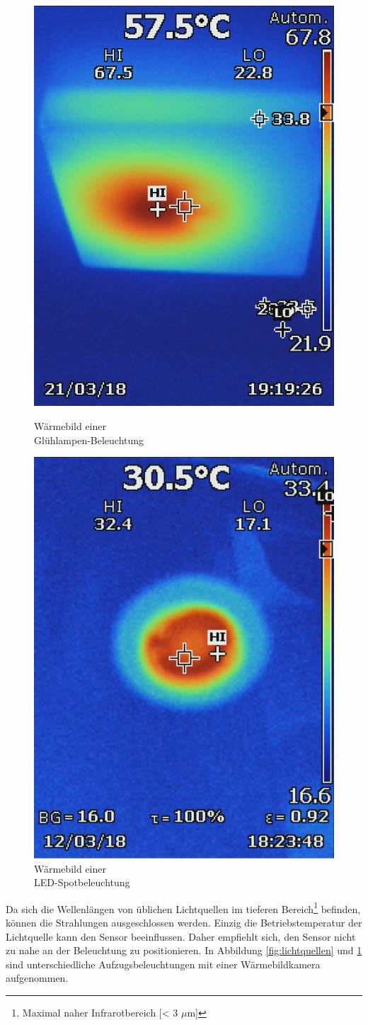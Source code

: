 \begin{figure}[!ht]
	\centering
	\begin{minipage}[b]{0.49\linewidth}
	\centering
	\includegraphics[width=0.5\linewidth]{fig/Lichtquellen.jpg}
	\caption{Wärmebild einer\\ Glühlampen-Beleuchtung}
	\label{fig:lichtquellen}
	\end{minipage}
	\hfill
	\begin{minipage}[b]{0.49\linewidth}
	\centering
	\includegraphics[width=0.5\linewidth]{fig/Lichtquelle.png}
	\caption{Wärmebild einer\\ LED-Spotbeleuchtung}
	\label{fig:m2lichtquelle}
	\end{minipage}
\end{figure}

Da sich die Wellenlängen von üblichen Lichtquellen im tieferen Bereich\footnote[12]{Maximal naher Infrarotbereich [< 3 $\mu$m]} befinden, können die Strahlungen ausgeschlossen werden. Einzig die Betriebstemperatur der Lichtquelle kann den Sensor beeinflussen. Daher empfiehlt sich, den Sensor nicht zu nahe an der Beleuchtung zu positionieren. In Abbildung \ref{fig:lichtquellen}  und \ref{fig:m2lichtquelle} sind unterschiedliche Aufzugsbeleuchtungen mit einer Wärmebildkamera aufgenommen.



